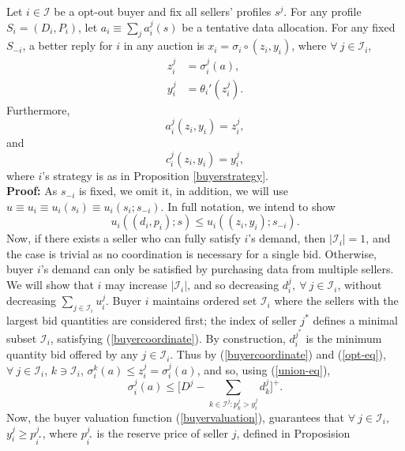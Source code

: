 \documentclass[sigconf, anonymous]{acmart}
\newcommand{\mcI}{\mathcal{I}}
\newcommand{\g}{\sigma}
\theoremstyle{definition}
\begin{document}
{
\label{coordinationlemma} 
Let $i\in\mcI$ be a opt-out buyer and fix all sellers' profiles $s^j$.
For any profile $S_i = (D_i, P_i)$, let $a_i \equiv \sum_j a_i^j(s)$ be a
tentative data
allocation. For any fixed $S_{-i}$, a better reply for $i$ in any auction is $x_i =
\g_i \circ (z_i,y_i)$, where $\forall \ j \in \mcI_i$,
\begin{align*}
    z_i^j &= \g_i^{j}(a), \\
    y_i^j &= \theta_i'(z_i^j).
\end{align*}
Furthermore,
\begin{equation}\label{allocationcoordination}
    a_i^j(z_i,y_i) = z_i^{j},
\end{equation}
and
\begin{equation}\label{costcoordination}
    c_i^j(z_i,y_i) = y_i^{j},
\end{equation}
where $i$'s strategy is as in Proposition \ref{buyerstrategy}.
}\\
\textbf{Proof:}
As $s_{-i}$ is fixed, we omit it, in addition, we will use $u\equiv u_i \equiv u_i(s_i) \equiv
u_i(s_i;s_{-i})$. In full notation, we intend to show
$$
    u_i((d_i,p_i);s) \le u_i((z_i,y_i);s_{-i}).
$$
Now, if there exists a seller who can fully satisfy $i$'s demand,
then $\vert\mcI_i\vert = 1$, and the case is trivial as no
coordination is necessary for a single bid. %
Otherwise, buyer $i$'s demand can only be satisfied by purchasing data from
multiple sellers.
We will show that $i$ may increase $\vert\mcI_i\vert$, and so decreasing
$d_i^j, \ \forall \ j\in\mcI_i$, without decreasing $\sum_{j\in\mcI_i}u_i^j$.
Buyer $i$ maintains ordered set $\mcI_i$ where the sellers with the
largest bid quantities are considered first; the index of seller $j^*$ defines
a minimal subset $\mcI_i$, satisfying (\ref{buyercoordinate}). By construction, 
$d_i^{j^*}$ is the minimum quantity bid offered by any $j\in \mcI_i$.
Thus by (\ref{buyercoordinate}) and (\ref{opt-eq}), $\forall \ j\in \mcI_i$,
$k\ni\mcI_i$, $\g_i^k(a) \le z_i^j = \g_i^{j}(a)$,
and so, using (\ref{union-eq}), 
\begin{equation}\label{minimaleq}
    \g_i^{j}(a)  \le \bigg\lbrack D^{j} - \sum_{k\in \mcI^j : p_k^{j}> y_{i}^{j}} d_k^{j}\bigg\rbrack^+.
\end{equation}
Now, the buyer valuation function (\ref{buyervaluation}), guarantees
that $\forall \ j\in\mcI_i$, $y_i^j \ge p_{i^*}^j$, where $p_{i^*}^j$ is the reserve price of seller $j$, defined in Proposision
\end{document}
